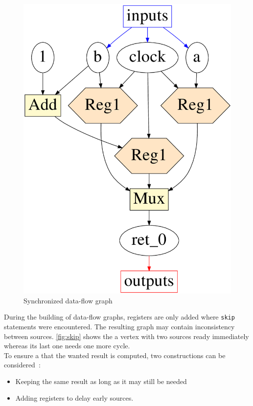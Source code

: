\documentclass[10pt,a4paper]{article}
\newcommand{\whileyLine}{\lstinline[language=Whiley,basicstyle=\normalsize\ttfamily]}
\begin{document}
\begin{figure}
	\vspace{-39pt}
	\includegraphics[scale=.23]{Reg_B.png}
	\caption{Synchronized data-flow graph}
\end{figure}

During the building of data-flow graphs, registers are only added where \whileyLine{skip} statements were encountered. The resulting graph may contain inconsistency between sources. \autoref{fig:skip} shows the a vertex with two sources ready immediately whereas its last one needs one more cycle.\\

To ensure a that the wanted result is computed, two constructions can be considered~:

\begin{itemize}
\item Keeping the same result as long as it may still be needed
\item Adding registers to delay early sources. 
\end{itemize}
\end{document}
